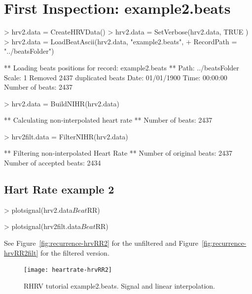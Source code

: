 \documentclass[a4paper, english, utf8]{amsart}
\newcommand{\figref}[1]{Figure\ \vref{#1}}
\begin{document}
\section{First Inspection: example2.beats}
\begin{Schunk}
\begin{Sinput}
> hrv2.data  = CreateHRVData()
> hrv2.data = SetVerbose(hrv2.data, TRUE )
> hrv2.data = LoadBeatAscii(hrv2.data, "example2.beats",
+        RecordPath = "../beatsFolder")
\end{Sinput}
\begin{Soutput}
** Loading beats positions for record: example2.beats **
   Path: ../beatsFolder 
   Scale: 1 
   Removed 2437 duplicated beats
   Date: 01/01/1900
   Time: 00:00:00
   Number of beats: 2437 
\end{Soutput}
\begin{Sinput}
> hrv2.data = BuildNIHR(hrv2.data)
\end{Sinput}
\begin{Soutput}
** Calculating non-interpolated heart rate **
   Number of beats: 2437 
\end{Soutput}
\begin{Sinput}
> hrv2filt.data = FilterNIHR(hrv2.data)
\end{Sinput}
\begin{Soutput}
** Filtering non-interpolated Heart Rate **
   Number of original beats: 2437 
   Number of accepted beats: 2434 
\end{Soutput}
\end{Schunk}

\subsection{Hart Rate example 2}
\begin{Schunk}
\begin{Sinput}
> plotsignal(hrv2.data$Beat$RR)
\end{Sinput}
\end{Schunk}
\begin{Schunk}
\begin{Sinput}
> plotsignal(hrv2filt.data$Beat$RR)
\end{Sinput}
\end{Schunk}
See \figref{fig:recurrence-hrvRR2} for the unfiltered and \figref{fig:recurrence-hrvRR2filt} for the filtered version.


\begin{figure}[htbp]
\begin{center}
\texttt{[image: heartrate-hrvRR2]}
\caption{RHRV tutorial example2.beats. Signal and linear interpolation.}
\label{fig:recurrence-hrvRR2}
\end{center}
\end{figure}
\end{document}
